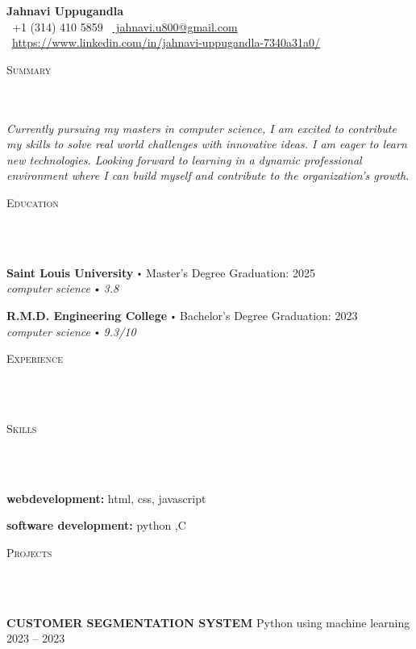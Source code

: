 \documentclass{article}
\newcommand{\school}[4]{
        \textbf{#1} \labelitemi #2 \hfill #3 \\ #4 \vspace*{5pt}
      }
\newcommand{\project}[4]{{
          \vspace*{2pt}%
          \textbf{#1} #2 \hfill #3\\ #4 \vspace*{2pt}}
          }
\newcommand{\lineunder}{
        \vspace*{-8pt} \\ \hspace*{-18pt} 
        \hrulefill \\
        }
\newcommand{\header}[1]{{
        \hspace*{-15pt}\vspace*{6pt} \textsc{#1}} \vspace*{-6pt} 
        \lineunder
        }
\renewcommand{\labelitemi}{
        $\vcenter{\hbox{\tiny$\bullet$}}$\hspace*{3pt}
        }
\renewcommand{\labelitemii}{
        $\vcenter{\hbox{\tiny$\bullet$}}$\hspace*{-3pt}
        }
\newenvironment{bullet-list-major}{
          \begin{list}{\labelitemii}{\setlength\leftmargin{3pt} 
          \topsep 0pt \itemsep -2pt}}{\vspace*{4pt}\end{list}
          }
\newenvironment{bullet-list-minor}{
          \begin{list}{\labelitemii}{\setlength\leftmargin{15pt} 
            \topsep 0pt \itemsep -2pt}}{\vspace*{4pt}\end{list}
            }
\begin{document}
  
      \small
      \smallskip
      \vspace*{-44pt}
  
      \begin{center}
        {\LARGE \textbf{Jahnavi Uppugandla}} \\
        \faPhone\ +1 (314) 410 5859 \quad
        \faEnvelope\ \href{mailto:  jahnavi.u800@gmail.com}{  jahnavi.u800@gmail.com} \quad
        \faLinkedin\ \url{https://www.linkedin.com/in/jahnavi-uppugandla-7340a31a0/}
      \end{center}
     \vspace*{4pt}%
      \header{Summary}
  
      {
        \textit{Currently pursuing my masters in computer science, I am excited to contribute my skills to solve real world
challenges with innovative ideas. I am eager to learn new technologies. Looking forward to learning in a
dynamic professional environment where I can build myself and contribute to the organization's growth.}
        }
  
      \vspace{15pt}
  
     \header{Education}
  
      {
        \school{Saint Louis University}{Master's Degree}{Graduation: 2025}{\textit{computer science \labelitemi 3.8}}
        

        \school{R.M.D. Engineering College}{Bachelor's Degree}{Graduation: 2023}{\textit{computer science \labelitemi 9.3/10}}
        }
  
      \vspace*{4pt}%
      \header{Experience}
  
      {}
      \vspace*{4pt}%

      \header{Skills}
      {
        \begin{bullet-list-major}
        \item \textbf{webdevelopment:} html, css, javascript
        \end{bullet-list-major}
        

        \begin{bullet-list-major}
        \item \textbf{software development:} python ,C
        \end{bullet-list-major}
        }
  
      \vspace*{4pt}%
      \header{Projects}
      {
      \project{CUSTOMER SEGMENTATION SYSTEM}{Python using machine learning}{2023 -- 2023}{
          \begin{bullet-list-minor}
              
          \end{bullet-list-minor}
      }
  }
  
\end{document}
